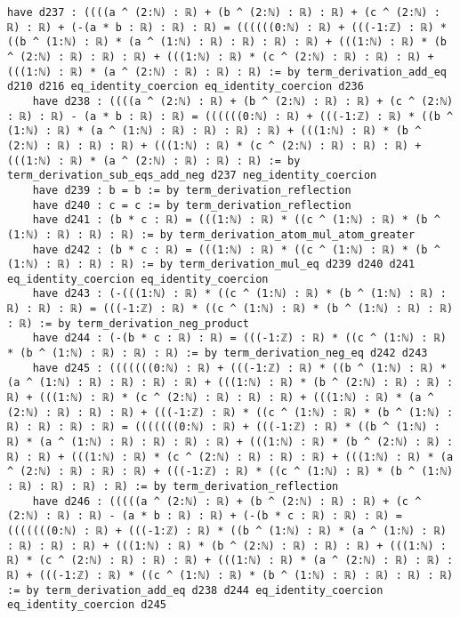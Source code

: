 \documentclass{article}
\begin{document}
\begin{tcolorbox}[colback=white!10, width=\linewidth]
\begin{lstlisting}[language=Lean4]
    have d237 : ((((a ^ (2:ℕ) : ℝ) + (b ^ (2:ℕ) : ℝ) : ℝ) + (c ^ (2:ℕ) : ℝ) : ℝ) + (-(a * b : ℝ) : ℝ) : ℝ) = ((((((0:ℕ) : ℝ) + (((-1:ℤ) : ℝ) * ((b ^ (1:ℕ) : ℝ) * (a ^ (1:ℕ) : ℝ) : ℝ) : ℝ) : ℝ) + (((1:ℕ) : ℝ) * (b ^ (2:ℕ) : ℝ) : ℝ) : ℝ) + (((1:ℕ) : ℝ) * (c ^ (2:ℕ) : ℝ) : ℝ) : ℝ) + (((1:ℕ) : ℝ) * (a ^ (2:ℕ) : ℝ) : ℝ) : ℝ) := by term_derivation_add_eq d210 d216 eq_identity_coercion eq_identity_coercion d236
    have d238 : ((((a ^ (2:ℕ) : ℝ) + (b ^ (2:ℕ) : ℝ) : ℝ) + (c ^ (2:ℕ) : ℝ) : ℝ) - (a * b : ℝ) : ℝ) = ((((((0:ℕ) : ℝ) + (((-1:ℤ) : ℝ) * ((b ^ (1:ℕ) : ℝ) * (a ^ (1:ℕ) : ℝ) : ℝ) : ℝ) : ℝ) + (((1:ℕ) : ℝ) * (b ^ (2:ℕ) : ℝ) : ℝ) : ℝ) + (((1:ℕ) : ℝ) * (c ^ (2:ℕ) : ℝ) : ℝ) : ℝ) + (((1:ℕ) : ℝ) * (a ^ (2:ℕ) : ℝ) : ℝ) : ℝ) := by term_derivation_sub_eqs_add_neg d237 neg_identity_coercion
    have d239 : b = b := by term_derivation_reflection
    have d240 : c = c := by term_derivation_reflection
    have d241 : (b * c : ℝ) = (((1:ℕ) : ℝ) * ((c ^ (1:ℕ) : ℝ) * (b ^ (1:ℕ) : ℝ) : ℝ) : ℝ) := by term_derivation_atom_mul_atom_greater
    have d242 : (b * c : ℝ) = (((1:ℕ) : ℝ) * ((c ^ (1:ℕ) : ℝ) * (b ^ (1:ℕ) : ℝ) : ℝ) : ℝ) := by term_derivation_mul_eq d239 d240 d241 eq_identity_coercion eq_identity_coercion
    have d243 : (-(((1:ℕ) : ℝ) * ((c ^ (1:ℕ) : ℝ) * (b ^ (1:ℕ) : ℝ) : ℝ) : ℝ) : ℝ) = (((-1:ℤ) : ℝ) * ((c ^ (1:ℕ) : ℝ) * (b ^ (1:ℕ) : ℝ) : ℝ) : ℝ) := by term_derivation_neg_product
    have d244 : (-(b * c : ℝ) : ℝ) = (((-1:ℤ) : ℝ) * ((c ^ (1:ℕ) : ℝ) * (b ^ (1:ℕ) : ℝ) : ℝ) : ℝ) := by term_derivation_neg_eq d242 d243
    have d245 : (((((((0:ℕ) : ℝ) + (((-1:ℤ) : ℝ) * ((b ^ (1:ℕ) : ℝ) * (a ^ (1:ℕ) : ℝ) : ℝ) : ℝ) : ℝ) + (((1:ℕ) : ℝ) * (b ^ (2:ℕ) : ℝ) : ℝ) : ℝ) + (((1:ℕ) : ℝ) * (c ^ (2:ℕ) : ℝ) : ℝ) : ℝ) + (((1:ℕ) : ℝ) * (a ^ (2:ℕ) : ℝ) : ℝ) : ℝ) + (((-1:ℤ) : ℝ) * ((c ^ (1:ℕ) : ℝ) * (b ^ (1:ℕ) : ℝ) : ℝ) : ℝ) : ℝ) = (((((((0:ℕ) : ℝ) + (((-1:ℤ) : ℝ) * ((b ^ (1:ℕ) : ℝ) * (a ^ (1:ℕ) : ℝ) : ℝ) : ℝ) : ℝ) + (((1:ℕ) : ℝ) * (b ^ (2:ℕ) : ℝ) : ℝ) : ℝ) + (((1:ℕ) : ℝ) * (c ^ (2:ℕ) : ℝ) : ℝ) : ℝ) + (((1:ℕ) : ℝ) * (a ^ (2:ℕ) : ℝ) : ℝ) : ℝ) + (((-1:ℤ) : ℝ) * ((c ^ (1:ℕ) : ℝ) * (b ^ (1:ℕ) : ℝ) : ℝ) : ℝ) : ℝ) := by term_derivation_reflection
    have d246 : (((((a ^ (2:ℕ) : ℝ) + (b ^ (2:ℕ) : ℝ) : ℝ) + (c ^ (2:ℕ) : ℝ) : ℝ) - (a * b : ℝ) : ℝ) + (-(b * c : ℝ) : ℝ) : ℝ) = (((((((0:ℕ) : ℝ) + (((-1:ℤ) : ℝ) * ((b ^ (1:ℕ) : ℝ) * (a ^ (1:ℕ) : ℝ) : ℝ) : ℝ) : ℝ) + (((1:ℕ) : ℝ) * (b ^ (2:ℕ) : ℝ) : ℝ) : ℝ) + (((1:ℕ) : ℝ) * (c ^ (2:ℕ) : ℝ) : ℝ) : ℝ) + (((1:ℕ) : ℝ) * (a ^ (2:ℕ) : ℝ) : ℝ) : ℝ) + (((-1:ℤ) : ℝ) * ((c ^ (1:ℕ) : ℝ) * (b ^ (1:ℕ) : ℝ) : ℝ) : ℝ) : ℝ) := by term_derivation_add_eq d238 d244 eq_identity_coercion eq_identity_coercion d245

\end{lstlisting}
\end{tcolorbox}
\end{document}
